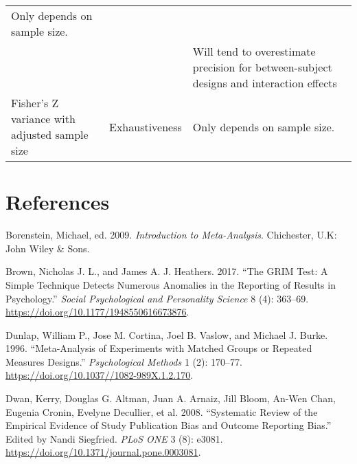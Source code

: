 \documentclass[]{article}
\begin{document}
\begin{longtable}[]{@{}lll@{}}
\begin{minipage}[t]{0.63\columnwidth}
Only depends on sample size.\strut
\end{minipage}\tabularnewline
\begin{minipage}[t]{0.18\columnwidth}\raggedright
\strut
\end{minipage} & \begin{minipage}[t]{0.10\columnwidth}\raggedright
\strut
\end{minipage} & \begin{minipage}[t]{0.63\columnwidth}\raggedright
Will tend to overestimate precision for between-subject designs and
interaction effects\strut
\end{minipage}\tabularnewline
\begin{minipage}[t]{0.18\columnwidth}\raggedright
Fisher's Z variance with adjusted sample size\strut
\end{minipage} & \begin{minipage}[t]{0.10\columnwidth}\raggedright
Exhaustiveness\strut
\end{minipage} & \begin{minipage}[t]{0.63\columnwidth}\raggedright
Only depends on sample size.\strut
\end{minipage}\tabularnewline
\bottomrule
\end{longtable}

\hypertarget{references}{%
\section*{References}\label{references}}

\hypertarget{refs}{}
\leavevmode\hypertarget{ref-Borenstein2009}{}%
Borenstein, Michael, ed. 2009. \emph{Introduction to Meta-Analysis}.
Chichester, U.K: John Wiley \& Sons.

\leavevmode\hypertarget{ref-Brown2017}{}%
Brown, Nicholas J. L., and James A. J. Heathers. 2017. ``The GRIM Test:
A Simple Technique Detects Numerous Anomalies in the Reporting of
Results in Psychology.'' \emph{Social Psychological and Personality
Science} 8 (4): 363--69. \url{https://doi.org/10.1177/1948550616673876}.

\leavevmode\hypertarget{ref-Dunlap1996}{}%
Dunlap, William P., Jose M. Cortina, Joel B. Vaslow, and Michael J.
Burke. 1996. ``Meta-Analysis of Experiments with Matched Groups or
Repeated Measures Designs.'' \emph{Psychological Methods} 1 (2):
170--77. \url{https://doi.org/10.1037//1082-989X.1.2.170}.

\leavevmode\hypertarget{ref-Dwan2008}{}%
Dwan, Kerry, Douglas G. Altman, Juan A. Arnaiz, Jill Bloom, An-Wen Chan,
Eugenia Cronin, Evelyne Decullier, et al. 2008. ``Systematic Review of
the Empirical Evidence of Study Publication Bias and Outcome Reporting
Bias.'' Edited by Nandi Siegfried. \emph{PLoS ONE} 3 (8): e3081.
\url{https://doi.org/10.1371/journal.pone.0003081}.
\end{document}
